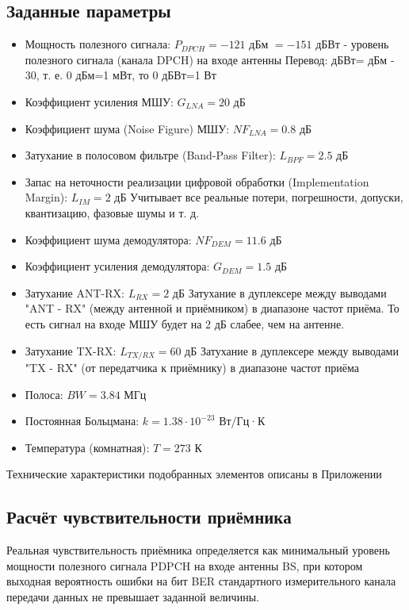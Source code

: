 \documentclass[a4paper,12pt]{article}
\begin{document}
\subsection{Заданные параметры}
\begin{itemize}
    \item Мощность полезного сигнала: $P_{DPCH} = -121$ дБм $= -151$ дБВт -  уровень полезного сигнала (канала DPCH) на входе антенны \newline
    Перевод: дБВт= дБм - 30,  т. е. 0 дБм=1 мВт, то 0 дБВт=1 Вт
    \item Коэффициент усиления МШУ: $G_{LNA} = 20$ дБ 
    \item Коэффициент шума (Noise Figure) МШУ: $NF_{LNA} = 0.8$ дБ
    \item Затухание в полосовом фильтре (Band-Pass Filter): $L_{BPF} = 2.5$ дБ
    \item Запас на неточности реализации цифровой обработки  (Implementation Margin): $L_{IM} = 2$ дБ
    Учитывает все реальные потери, погрешности, допуски, квантизацию, фазовые шумы и т. д.
    \item Коэффициент шума демодулятора: $NF_{DEM} = 11.6$ дБ
    \item Коэффициент усиления демодулятора: $G_{DEM} = 1.5$ дБ
    \item Затухание ANT-RX: $L_{RX} = 2$ дБ  \newline
    Затухание в дуплексере между выводами "ANT - RX" (между антенной и приёмником) в диапазоне частот приёма. То есть сигнал на входе МШУ будет на 2 дБ слабее, чем на антенне.
    \item Затухание TX-RX: $L_{TX/RX} = 60$ дБ  \newline
    Затухание в дуплексере между выводами "TX - RX" (от передатчика к приёмнику)  в диапазоне частот приёма
    \item Полоса: $BW = 3.84$ МГц
    \item Постоянная Больцмана: $k = 1.38\cdot10^{-23}$ Вт/Гц·К
    \item Температура (комнатная): $T = 273$ К
\end{itemize}
Технические характеристики подобранных элементов описаны в Приложении












\subsection{Расчёт чувствительности приёмника}
Реальная чувствительность приёмника определяется как минимальный уровень мощности полезного сигнала PDPCH на входе антенны BS, при котором выходная вероятность ошибки на бит BER стандартного измерительного канала передачи данных не превышает заданной величины.
\end{document}
